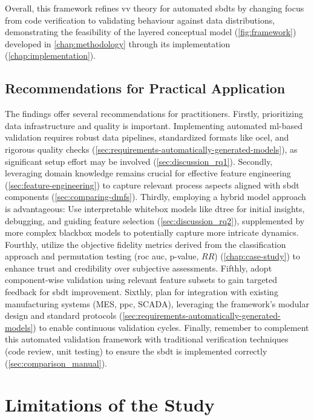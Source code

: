 Overall, this framework refines \gls{vv} theory for automated \gls{sbdt}s by changing focus from code verification to validating behaviour against data distributions, demonstrating the feasibility of the layered conceptual model (\autoref{fig:framework}) developed in \autoref{chap:methodology} through its implementation (\autoref{chap:implementation}).

\subsection{Recommendations for Practical Application}
\label{sec:implications_practical}

The findings offer several recommendations for practitioners. Firstly, prioritizing data infrastructure and quality is important. Implementing automated \gls{ml}-based validation requires robust data pipelines, standardized formats like \gls{ocel}, and rigorous quality checks (\autoref{sec:requirements-automatically-generated-models}), as significant setup effort may be involved (\autoref{sec:discussion_rq1}). Secondly, leveraging domain knowledge remains crucial for effective feature engineering (\autoref{sec:feature-engineering}) to capture relevant process aspects aligned with \gls{sbdt} components (\autoref{sec:comparing-dmfs}). Thirdly, employing a hybrid model approach is advantageous: Use interpretable whitebox models like \gls{dtree} for initial insights, debugging, and guiding feature selection (\autoref{sec:discussion_rq2}), supplemented by more complex blackbox models to potentially capture more intricate dynamics. Fourthly, utilize the objective fidelity metrics derived from the classification approach and permutation testing (\gls{roc} \gls{auc}, p-value, $RR$) (\autoref{chap:case-study}) to enhance trust and credibility over subjective assessments. Fifthly, adopt component-wise validation using relevant feature subsets to gain targeted feedback for \gls{sbdt} improvement. Sixthly, plan for integration with existing manufacturing systems (MES, \gls{ppc}, SCADA), leveraging the framework's modular design and standard protocols (\autoref{sec:requirements-automatically-generated-models}) to enable continuous validation cycles. Finally, remember to complement this automated validation framework with traditional verification techniques (code review, unit testing) to ensure the \gls{sbdt} is implemented correctly (\autoref{sec:comparison_manual}).

\section{Limitations of the Study}
\label{sec:discussion_limitations}

